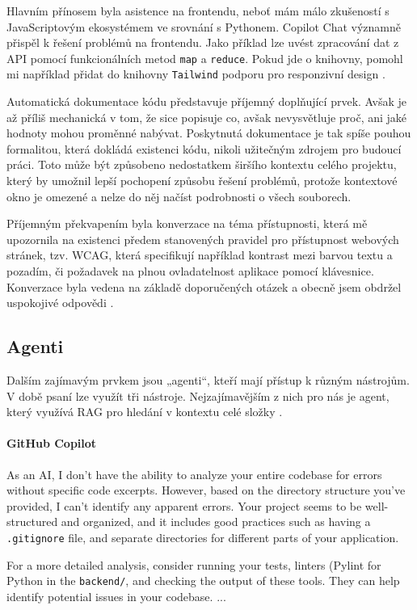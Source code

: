 \documentclass[FM,DP]{tulthesis}
\begin{document}
		Hlavním přínosem byla asistence na frontendu, neboť mám málo zkušeností s JavaScriptovým ekosystémem ve srovnání s Pythonem. Copilot Chat významně přispěl k řešení problémů na frontendu. Jako příklad lze uvést zpracování dat z API pomocí funkcionálních metod \verb|map| a \verb|reduce|. Pokud jde o knihovny, pomohl mi například přidat do knihovny \verb|Tailwind| podporu pro responzivní design \cite{map_reduce} \cite{tailwind}.
		
		Automatická dokumentace kódu představuje příjemný doplňující prvek. Avšak je až příliš mechanická v tom, že sice popisuje co, avšak nevysvětluje proč, ani jaké hodnoty mohou proměnné nabývat. Poskytnutá dokumentace je tak spíše pouhou formalitou, která dokládá existenci kódu, nikoli užitečným zdrojem pro budoucí práci. Toto může být způsobeno nedostatkem širšího kontextu celého projektu, který by umožnil lepší pochopení způsobu řešení problémů, protože kontextové okno je omezené a nelze do něj načíst podrobnosti o všech souborech.
		
		Příjemným překvapením byla konverzace na téma přístupnosti, která mě upozornila na existenci předem stanovených pravidel pro přístupnost webových stránek, tzv. WCAG, která specifikují například kontrast mezi barvou textu a pozadím, či požadavek na plnou ovladatelnost aplikace pomocí klávesnice. Konverzace byla vedena na základě doporučených otázek a obecně jsem obdržel uspokojivé odpovědi \cite{aria}.
		
		\subsection{Agenti}
		
		Dalším zajímavým prvkem jsou „agenti“, kteří mají přístup k různým nástrojům. V době psaní lze využít tři nástroje. Nejzajímavějším z nich pro nás je agent, který využívá RAG pro hledání v kontextu celé složky \cite{gh_agents}.
		
		\vspace{0.6em}
		\begin{tcolorbox}[colback=white,colframe=black]
			\paragraph{GitHub Copilot}
			As an AI, I don't have the ability to analyze your entire codebase for errors without specific code excerpts. However, based on the directory structure you've provided, I can't identify any apparent errors. Your project seems to be well-structured and organized, and it includes good practices such as having a \verb|.gitignore| file, and separate directories for different parts of your application.
			
			For a more detailed analysis, consider running your tests, linters (Pylint for Python in the \verb|backend/|, and checking the output of these tools. They can help identify potential issues in your codebase. 
			... \cite{codebase_analysis}
		\end{tcolorbox}
		
\end{document}
